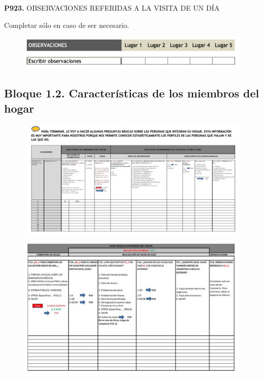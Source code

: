 \documentclass[
  openany]{book}
\begin{document}
\textbf{P923.} OBSERVACIONES REFERIDAS A LA VISITA DE UN DÍA

Completar sólo en caso de ser necesario.

\begin{figure}

{\centering \includegraphics[width=1\linewidth]{imagenes/figura6-298} 

}

\end{figure}

\hypertarget{bloque-1.2.-caracteruxedsticas-de-los-miembros-del-hogar}{%
\subsection{Bloque 1.2. Características de los miembros del hogar}\label{bloque-1.2.-caracteruxedsticas-de-los-miembros-del-hogar}}

\begin{figure}

{\centering \includegraphics[width=1\linewidth]{imagenes/figura6-299} 

}

\end{figure}
\begin{figure}

{\centering \includegraphics[width=1\linewidth]{imagenes/figura6-300} 

}

\end{figure}
\end{document}
